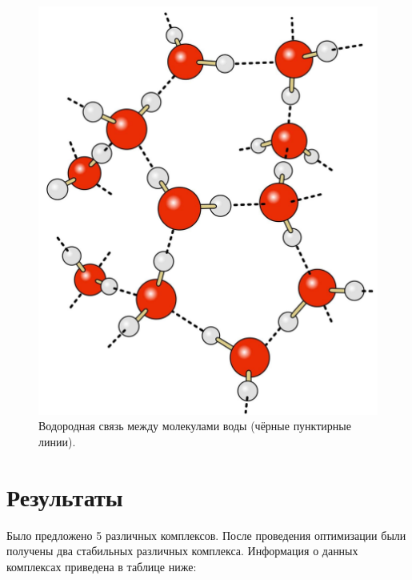 \begin{figure}[H]
\centering
\captionsetup{justification=centering}
\includegraphics[scale=0.2]{fig/1.jpg}
\caption{Водородная связь между молекулами воды (чёрные пунктирные линии).}
\end{figure}

\newpage
\section{Результаты}
Было предложено 5 различных комплексов. После проведения оптимизации были получены два стабильных различных комплекса. Информация о данных комплексах приведена в таблице ниже: 

